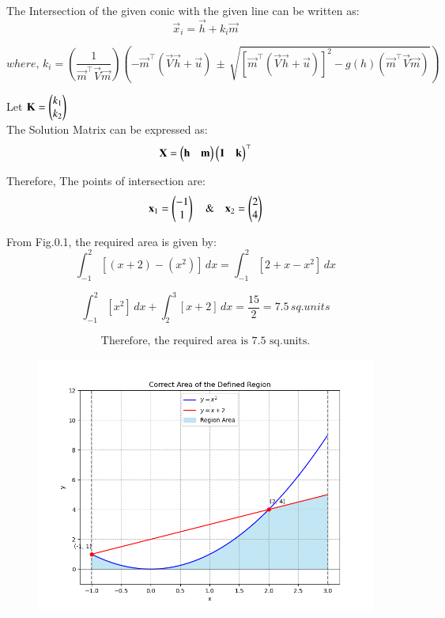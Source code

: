 \documentclass[journal]{IEEEtran}
\begin{document}
The Intersection of the given conic with the given line can be written as:
\begin{equation}
    \vec{x}_i = \vec{h} + k_i\vec{m}
\end{equation}

\begin{equation}
    where, \, k_i = \left( \dfrac{1}{\vec{m}^\top\vec{V}\vec{m}} \right) \left( 
    -\vec{m}^\top(\vec{V}\vec{h}+\vec{u}) \, \pm \, \sqrt{[\vec{m}^\top(\vec{V}\vec{h}+\vec{u})]^2 - g(h)(\vec{m}^\top\vec{V}\vec{m})} \right) 
\end{equation}

Let $\mathbf{K} = \begin{pmatrix}k_1 \\ k_2\end{pmatrix}$\\



The Solution Matrix can be expressed as: 
\begin{equation}
    \mathbf{X} = \begin{pmatrix}\mathbf{h} & \mathbf{m}\end{pmatrix}\begin{pmatrix}\mathbf{1} & \mathbf{k}\end{pmatrix}^\top
\end{equation}

Therefore, The points of intersection are:
\begin{equation}
    \mathbf{x}_1 = \begin{pmatrix}-1 \\ 1\end{pmatrix} \quad \& \quad \mathbf{x}_2 = \begin{pmatrix}2 \\4\end{pmatrix}
\end{equation}


From Fig.0.1, the required area is given by:
\begin{equation}
    \int_{-1}^{2} [(x+2) - (x^2)] \,dx = \int_{-1}^{2} [2 + x -x^2] \,dx
\end{equation}

\begin{equation}
 \int_{-1}^{2} [x^2] \,dx + \int_{2}^{3} [x+2] \,dx  = \dfrac{15}{2} = 7.5 \, sq.units   
\end{equation}

\begin{align*}
\boxed{\text{Therefore, the required area is 7.5 sq.units.}}
\end{align*}



\begin{figure}[H]
    \centering
    \includegraphics[width=0.8\linewidth]{figs/plot.png}
    \caption{}
    \label{fig:placeholder}
\end{figure}
\end{document}
